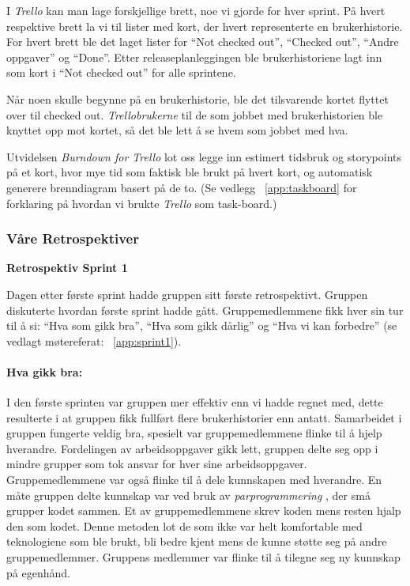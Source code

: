 \documentclass[12pt,a4paper,norsk]{article}
\begin{document}
    I \textit{Trello} kan man lage forskjellige brett, noe vi gjorde for hver sprint. På hvert respektive brett la vi til lister med kort, der hvert representerte en brukerhistorie. For hvert brett ble det laget lister for “Not checked out”, “Checked out”, “Andre oppgaver” og “Done”. Etter releaseplanleggingen ble brukerhistoriene lagt inn som kort i “Not checked out” for alle sprintene.

    Når noen skulle begynne på en brukerhistorie, ble det tilsvarende kortet flyttet over til checked out. \textit{Trellobrukerne} til de som jobbet med brukerhistorien ble knyttet opp mot kortet, så det ble lett å se hvem som jobbet med hva.

    Utvidelsen \textit{Burndown for Trello} lot oss legge inn estimert tidsbruk og storypoints på et kort, hvor mye tid som faktisk ble brukt på hvert kort, og automatisk generere brenndiagram basert på de to. (Se vedlegg ~\ref{app:taskboard} for forklaring på hvordan vi brukte \textit{Trello} som task-board.)
  \subsubsection{Våre Retrospektiver}

\bigskip \noindent \textbf{Retrospektiv Sprint 1}
\par Dagen etter første sprint hadde gruppen sitt første retrospektivt. Gruppen  diskuterte hvordan første sprint hadde gått. Gruppemedlemmene fikk hver sin tur til å si: “Hva som gikk bra”, “Hva som gikk dårlig” og “Hva vi kan forbedre” (se vedlagt møtereferat: ~\cref{app:sprint1}).

\paragraph{Hva gikk bra:}
I den første sprinten var gruppen mer effektiv enn vi hadde regnet med, dette resulterte i at gruppen fikk fullført flere brukerhistorier enn antatt. Samarbeidet i gruppen fungerte veldig bra, spesielt var gruppemedlemmene flinke til å hjelp hverandre. Fordelingen av arbeidsoppgaver gikk lett, gruppen delte seg opp i mindre grupper som tok ansvar for hver sine arbeidsoppgaver. Gruppemedlemmene var også flinke til å dele kunnskapen med hverandre. En måte gruppen delte kunnskap var ved bruk av \textit{parprogrammering} \cite[side 17]{dyba}, der små grupper kodet sammen. Et av gruppemedlemmene skrev koden mens resten hjalp den som kodet. Denne metoden lot de som ikke var helt komfortable med teknologiene som ble brukt, bli bedre kjent mens de kunne støtte seg på andre gruppemedlemmer. Gruppens medlemmer var flinke til å tilegne seg ny kunnskap på egenhånd.
\end{document}
